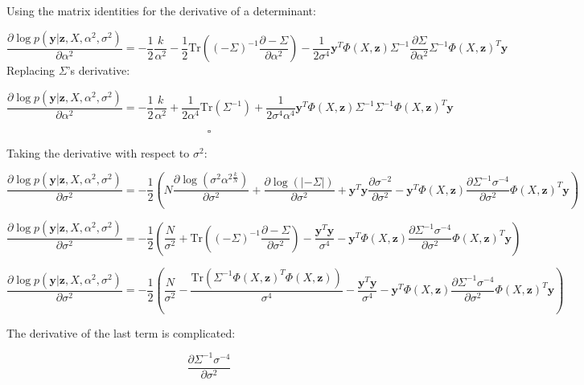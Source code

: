 \documentclass[11pt]{article}
\newcommand{\mbf}[1]{{\boldsymbol{\mathbf{#1}}}}
\renewcommand{\bm}{\mbf}
\newcommand{\Tr}{\textrm{Tr}}
\begin{document}
\begin{enumerate}
\begin{enumerate}[label=(\alph*)]
            Using the matrix identities for the derivative of a determinant:

            $$
            \dfrac{\partial \log p(\bm{y}|\bm{z}, X, \alpha^2, \sigma^2)}{\partial \alpha^2} = - \dfrac{1}{2} \dfrac{k}{\alpha^2} - \dfrac{1}{2} \Tr((-\Sigma)^{-1} \dfrac{\partial -\Sigma}{\partial \alpha^2}) - \dfrac{1}{2 \sigma^4} \bm{y}^T \Phi(X, \bm{z}) \Sigma^{-1} \dfrac{\partial \Sigma}{\partial \alpha^2} \Sigma^{-1} \Phi(X, \bm{z})^T\bm{y}
            $$
            Replacing $\Sigma$'s derivative:

            $$
            \dfrac{\partial \log p(\bm{y}|\bm{z}, X, \alpha^2, \sigma^2)}{\partial \alpha^2} = - \dfrac{1}{2} \dfrac{k}{\alpha^2} + \dfrac{1}{2 \alpha^4} \Tr(\Sigma^{-1}) + \dfrac{1}{2 \sigma^4 \alpha^4} \bm{y}^T \Phi(X, \bm{z}) \Sigma^{-1} \Sigma^{-1} \Phi(X, \bm{z})^T\bm{y}
            $$

            $$\square$$

            Taking the derivative with respect to $\sigma^2$:

            $$
            \dfrac{\partial \log p(\bm{y}|\bm{z}, X, \alpha^2, \sigma^2)}{\partial \sigma^2} = - \dfrac{1}{2} (N \dfrac{\partial \log (\sigma^{2}\alpha^{2\frac{k}{N}})}{\partial \sigma^2} + \dfrac{\partial \log(|-\Sigma|)}{\partial \sigma^2} + \bm{y}^T \bm{y} \dfrac{\partial \sigma^{-2}}{\partial \sigma^2} - \bm{y}^T \Phi(X, \bm{z}) \dfrac{\partial \Sigma^{-1} \sigma^{-4}}{\partial \sigma^2} \Phi(X, \bm{z})^T\bm{y})
            $$

            $$
            \dfrac{\partial \log p(\bm{y}|\bm{z}, X, \alpha^2, \sigma^2)}{\partial \sigma^2} = - \dfrac{1}{2} (\dfrac{N}{\sigma^2} + \Tr((-\Sigma)^{-1} \dfrac{\partial -\Sigma}{\partial \sigma^2}) - \dfrac{\bm{y}^T \bm{y}}{\sigma^4} - \bm{y}^T \Phi(X, \bm{z}) \dfrac{\partial \Sigma^{-1} \sigma^{-4}}{\partial \sigma^2} \Phi(X, \bm{z})^T\bm{y})
            $$

            $$
            \dfrac{\partial \log p(\bm{y}|\bm{z}, X, \alpha^2, \sigma^2)}{\partial \sigma^2} = - \dfrac{1}{2} (\dfrac{N}{\sigma^2} - \dfrac{\Tr(\Sigma^{-1} \Phi(X, \bm{z})^T \Phi(X, \bm{z}))}{\sigma^4} - \dfrac{\bm{y}^T \bm{y}}{\sigma^4} - \bm{y}^T \Phi(X, \bm{z}) \dfrac{\partial \Sigma^{-1} \sigma^{-4}}{\partial \sigma^2} \Phi(X, \bm{z})^T\bm{y})
            $$

            The derivative of the last term is complicated:

            $$
            \dfrac{\partial \Sigma^{-1} \sigma^{-4}}{\partial \sigma^2}
            $$


\end{enumerate}
\end{enumerate}
\end{document}
